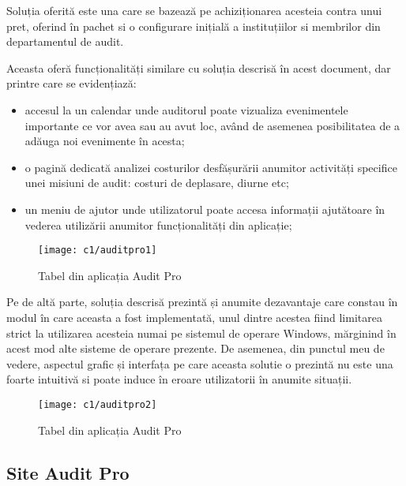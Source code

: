 	Soluția oferită este una care se bazează pe achiziționarea acesteia contra unui pret, oferind în pachet si o configurare inițială a instituțiilor si membrilor din departamentul de audit.
	
	Aceasta oferă funcționalități similare cu soluția descrisă în acest document, dar printre care se evidențiază:
	 
	\begin{itemize}
		\item accesul la un calendar unde auditorul poate vizualiza evenimentele importante ce vor avea sau au avut loc, având de asemenea posibilitatea de a adăuga noi evenimente în acesta;
		
		\item o pagină dedicată analizei costurilor desfășurării anumitor activități specifice unei misiuni de audit: costuri de deplasare, diurne etc;
		
		\item un meniu de ajutor unde utilizatorul poate accesa informații ajutătoare în vederea utilizării anumitor funcționalități din aplicație;
		
	\end{itemize}
	
	\vspace{1cm}
	\begin{figure}[h]
		\centering
		
		\texttt{[image: c1/auditpro1]}
		\caption{Tabel din aplicația Audit Pro}
	\end{figure}
	
	
	
Pe de altă parte, soluția descrisă prezintă și anumite dezavantaje care constau în modul în care aceasta a fost implementată, unul dintre acestea fiind limitarea strict la utilizarea acesteia numai pe sistemul de operare Windows, mărginind în acest mod alte sisteme de operare prezente.
De asemenea, din punctul meu de vedere, aspectul grafic și interfața pe care aceasta solutie o prezintă nu este una foarte intuitivă si poate induce în eroare utilizatorii în anumite situații.
\vspace{1cm}
\begin{figure}[h]
	\centering
	
	\texttt{[image: c1/auditpro2]}
	\caption{Tabel din aplicația Audit Pro}
\end{figure}

	\newpage
	\subsection*{Site Audit Pro }
	
